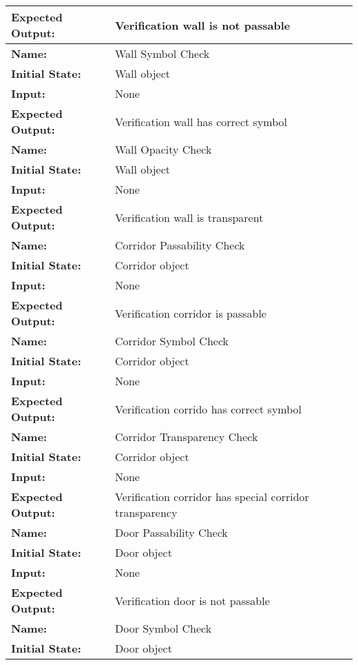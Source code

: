 \documentclass[12pt, titlepage]{article}
\begin{document}
\begin{center}
\begin{longtable}{ l | p{10cm} }
				\textbf{Expected Output:} & Verification wall is not passable\\[1em]
				\hline
				\rule{0pt}{2em}\textbf{Name:} & Wall Symbol Check\\
				\textbf{Initial State:} & Wall object\\
				\textbf{Input:} & None\\
				\textbf{Expected Output:} & Verification wall has correct symbol\\[1em]
				\hline
				\rule{0pt}{2em}\textbf{Name:} & Wall Opacity Check\\
				\textbf{Initial State:} & Wall object\\
				\textbf{Input:} & None\\
				\textbf{Expected Output:} & Verification wall is transparent\\[1em]
				\rule{0pt}{2em}\textbf{Name:} & Corridor Passability Check\\
				\textbf{Initial State:} & Corridor object\\
				\textbf{Input:} & None\\
				\textbf{Expected Output:} & Verification corridor is passable\\[1em]
				\hline
				\rule{0pt}{2em}\textbf{Name:} & Corridor Symbol Check\\
				\textbf{Initial State:} & Corridor object\\
				\textbf{Input:} & None\\
				\textbf{Expected Output:} & Verification corrido has correct symbol\\[1em]
				\hline
				\rule{0pt}{2em}\textbf{Name:} & Corridor Transparency Check\\
				\textbf{Initial State:} & Corridor object\\
				\textbf{Input:} & None\\
				\textbf{Expected Output:} & Verification corridor has special corridor transparency\\[1em]
				\hline
				\rule{0pt}{2em}\textbf{Name:} & Door Passability Check\\
				\textbf{Initial State:} & Door object\\
				\textbf{Input:} & None\\
				\textbf{Expected Output:} & Verification door is not passable\\[1em]
				\hline
				\rule{0pt}{2em}\textbf{Name:} & Door Symbol Check\\
				\textbf{Initial State:} & Door object\\

\end{longtable}
\end{center}
\end{document}
